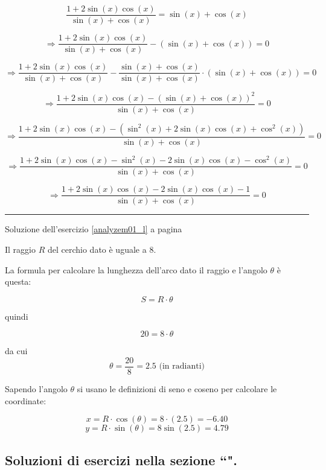 \[
\frac{
1+2\sin(x)\cos(x)
}{
\sin(x)+\cos(x)
}
=
\sin(x)+\cos(x)
\]


\[
\Rightarrow
\frac{
1+2\sin(x)\cos(x)
}{
\sin(x)+\cos(x)
}
-(\sin(x)+\cos(x))
=
0
\]

\[
\Rightarrow
\frac{
1+2\sin(x)\cos(x)
}{
\sin(x)+\cos(x)
}
-\frac{
\sin(x)+\cos(x)
}{
\sin(x)+\cos(x)
}\cdot(\sin(x)+\cos(x))
=
0
\]


\[
\Rightarrow
\frac{
1+2\sin(x)\cos(x)
-(
\sin(x)+\cos(x)
)^2
}{
\sin(x)+\cos(x)
}
=
0
\]


\[
\Rightarrow
\frac{
1+2\sin(x)\cos(x)
-(
\sin^2(x)+2\sin(x)\cos(x)+\cos^2(x)
)
}{
\sin(x)+\cos(x)
}
=
0
\]


\[
\Rightarrow
\frac{
1+2\sin(x)\cos(x)
-\sin^2(x)-2\sin(x)\cos(x)-\cos^2(x)
}{
\sin(x)+\cos(x)
}
=
0
\]


\[
\Rightarrow
\frac{
1+2\sin(x)\cos(x)-2\sin(x)\cos(x)-1
}{
\sin(x)+\cos(x)
}
=
0
\]


\vspace{1cm}
\hrule
\vspace{1cm}


Soluzione dell'esercizio \ref{analyzem01_l} a pagina \pageref{analyzem01_l}\label{analyzem01_s}

Il raggio $R$ del cerchio dato è uguale a $8$.

La formula per calcolare la lunghezza dell'arco dato il raggio e l'angolo $\theta$ è questa:

\[
S=R\cdot\theta
\]

quindi 

\[
20 = 8 \cdot \theta 
\]

da cui 
\[
\theta =\frac{20}{8} = 2.5 \textrm{ (in radianti)}
\]

Sapendo l'angolo $\theta$ si usano le definizioni di seno e coseno per calcolare le coordinate:

\[
x=R\cdot\cos(\theta) = 8\cdot (2.5) = -6.40
\]
\[
y = R\cdot \sin(\theta) = 8 \sin(2.5) = 4.79
\]

\subsection{Soluzioni di esercizi nella sezione ``\textbf{}".}


